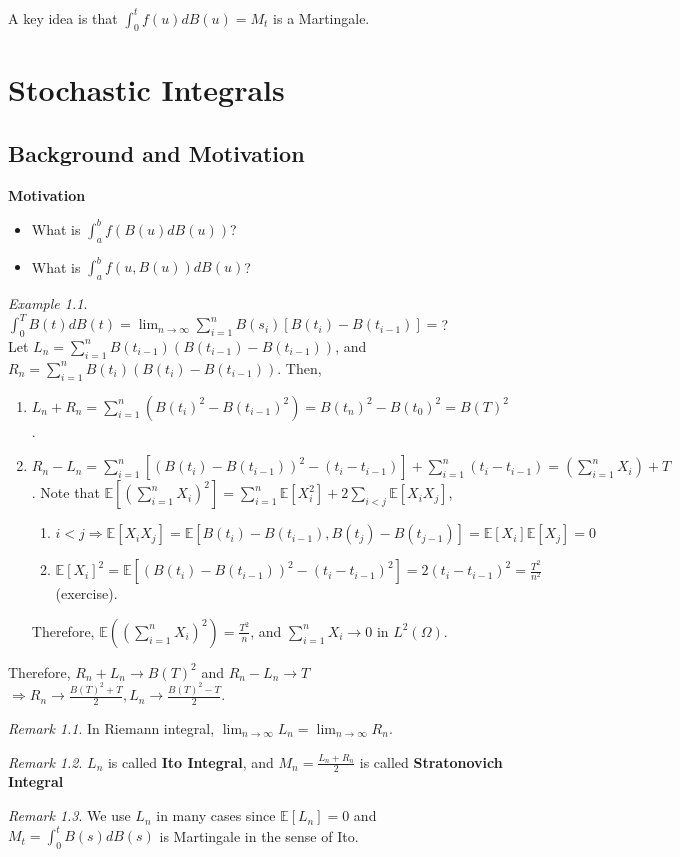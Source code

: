\documentclass[12pt]{report}
\newcommand{\E}{\mathbb{E}}
\renewcommand{\1}{\mathbb{1}}
\renewcommand{\O}{\Omega}
\theoremstyle{break}
\theoremstyle{newdef}
\theoremstyle{remark}
\newtheorem*{exmp}{Example} %
\newtheorem*{rem}{Remark} %
\begin{document}
A key idea is that $\int_0^t f(u) dB(u) = M_t$ is a Martingale.



\setcounter{chapter}{3}
\chapter{Stochastic Integrals}
\section{Background and Motivation}

\textbf{Motivation}
\begin{itemize}
\item What is $\int_a^b f(B(u)dB(u))$?
\item What is $\int_a^b f(u,B(u))dB(u)$?
\end{itemize}

\begin{exmp}
$\int_0^T B(t)dB(t) = \lim_{n\rightarrow\infty} \sum_{i=1}^n B(s_i) \left[B(t_i) - B(t_{i-1})\right] = $?\\
Let $L_n = \sum_{i=1}^n B(t_{i-1})(B(t_{i-1}) - B(t_{i-1}))$, and
$R_n = \sum_{i=1}^n B(t_i) (B(t_i) - B(t_{i-1}))$.
Then,
\begin{enumerate}%
\item $L_n + R_n = \sum_{i=1}^n (B(t_i)^2 - B(t_{i-1})^2) = B(t_n)^2 - B(t_0)^2 = B(T)^2$.
\item $R_n - L_n = \sum_{i=1}^n [(B(t_i) - B(t_{i-1}))^2 - (t_i-t_{i-1})] + \sum_{i=1}^n (t_i - t_{i-1}) = (\sum_{i=1}^n X_i) + T$.
Note that $\E[(\sum_{i=1}^n X_i)^2] = \sum_{i=1}^n \E[X_i^2] + 2\sum_{i<j} \E[X_iX_j]$,
\begin{enumerate}[wide]
\item
$i < j \Rightarrow \E[X_iX_j] = \E[B(t_i)-B(t_{i-1}), B(t_j) - B(t_{j-1}) ] = \E[X_i]\E[X_j] = 0$

\item
$\E[X_i]^2 = \E\left[ (B(t_i)-B(t_{i-1}))^2 - (t_i - t_{i-1})^2 \right] = 2(t_i-t_{i-1})^2 = \frac{T^2}{n^2}$ (exercise).
\end{enumerate}
Therefore, $\E((\sum_{i=1}^n X_i)^2) = \frac{T^2}{n}$, and
$\sum_{i=1}^n X_i \rightarrow 0$ in $L^2(\O) .$%
\end{enumerate}
Therefore, $R_n + L_n \rightarrow B(T)^2$ and $R_n - L_n \rightarrow T$\\
$\Rightarrow R_n \rightarrow \frac{B(T)^2 + T}{2}, L_n \rightarrow \frac{B(T)^2 - T}{2}$.

\begin{rem}
In Riemann integral, $\lim_{n\rightarrow\infty} L_n = \lim_{n\rightarrow\infty} R_n$.
\end{rem}

\begin{rem}
$L_n$ is called \textbf{Ito Integral}, and
$M_n = \frac{L_n + R_n}{2}$ is called \textbf{Stratonovich Integral}
\end{rem}
\begin{rem}
We use $L_n$ in many cases since $\E[L_n] = 0$ and $M_t = \int_0^t B(s) dB(s)$ is Martingale in the sense of Ito.
\end{rem}
\end{exmp}
\end{document}
